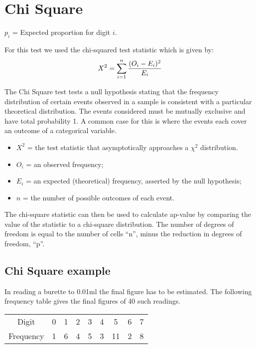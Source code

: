 

\section{Chi Square}


$p_{i}$ = Expected proportion for digit $i$.

For this test we used the chi-squared test statistic which is given by:
\begin{equation}
X^2 = \sum_{i=1}^{n} {(O_i - E_i)^2 \over E_i}
\end{equation}


The Chi Square test tests a null hypothesis stating that the frequency distribution of certain events observed in a sample is consistent with a particular theoretical distribution. The events considered must be mutually exclusive and have total probability 1. A common case for this is where the events each cover an outcome of a categorical variable.

\begin{itemize}
\item $X^2$ = the test statistic that asymptotically approaches a $\chi^2$ distribution.
\item $O_i$ = an observed frequency;
\item $E_i$ = an expected (theoretical) frequency, asserted by the null hypothesis;
\item $n $  = the number of possible outcomes of each event.
\end{itemize}

The chi-square statistic can then be used to calculate ap-value by comparing the value of the statistic to a chi-square distribution. The number of degrees of freedom is equal to the number of cells ``n'', minus the reduction in degrees of freedom, ``p''.
\subsection{Chi Square example}
In reading a burette to 0.01ml the final figure has to be estimated.
The following frequency table gives the final figures of 40 such readings.

\begin{tabular}{|c|c|c|c|c|c|c|c|c|}
\hline
Digit & 0 & 1 & 2 & 3 & 4 & 5 & 6 & 7 \\
Frequency& 1 & 6 & 4 & 5 & 3 & 11 & 2 & 8 \\
\hline
\end{tabular}

